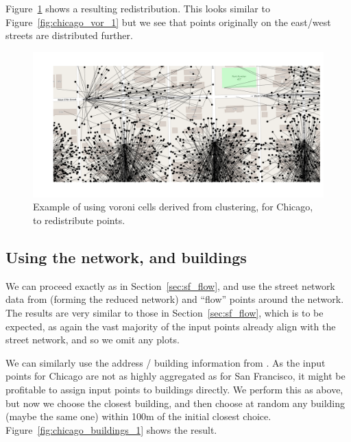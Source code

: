 \documentclass[twoside,a4paper,twocolumn,10pt]{article}
\theoremstyle{plain}
\theoremstyle{definition}
\begin{document}
Figure~\ref{fig:chicago_vor_4} shows a resulting redistribution.  This looks similar to
Figure~\ref{fig:chicago_vor_1} but we see that points originally on the east/west streets
are distributed further.

\begin{figure}
  \includegraphics[width=\textwidth]{chicago_redist_cluster.png}
  \caption{Example of using voroni cells derived from clustering, for Chicago, to redistribute points.}
  \label{fig:chicago_vor_4}
\end{figure}


\subsection{Using the network, and buildings}

We can proceed exactly as in Section~\ref{sec:sf_flow}, and use the street network data
from \cite{tiger} (forming the reduced network) and ``flow'' points around the network.
The results are very similar to those in Section~\ref{sec:sf_flow}, which is to be expected,
as again the vast majority of the input points already align with the street network, and
so we omit any plots.

We can similarly use the address / building information from \cite{oa}.  As the input points
for Chicago are not as highly aggregated as for San Francisco, it might be profitable to
assign input points to buildings directly.  We perform this as above, but now we choose the
closest building, and then choose at random any building (maybe the same one) within 100m
of the initial closest choice.  Figure~\ref{fig:chicago_buildings_1} shows the result.
\end{document}
